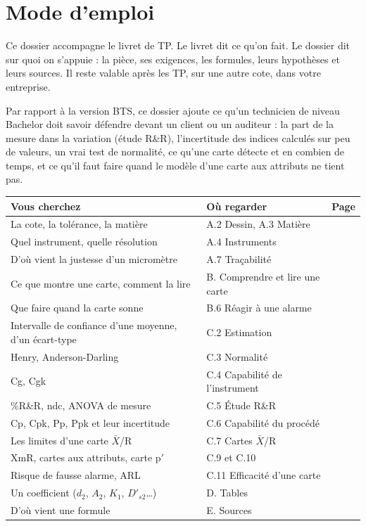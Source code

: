 \documentclass[11pt,a4paper]{article}
\begin{document}
\setcounter{page}{1}
\section*{Mode d'emploi}
Ce dossier accompagne le livret de TP. Le livret dit ce qu'on fait. Le dossier dit sur quoi on s'appuie : la pièce, ses exigences, les formules, leurs hypothèses et leurs sources. Il reste valable après les TP, sur une autre cote, dans votre entreprise.

Par rapport à la version BTS, ce dossier ajoute ce qu'un technicien de niveau Bachelor doit savoir défendre devant un client ou un auditeur : la part de la mesure dans la variation (étude R\&R), l'incertitude des indices calculés sur peu de valeurs, un vrai test de normalité, ce qu'une carte détecte et en combien de temps, et ce qu'il faut faire quand le modèle d'une carte aux attributs ne tient pas.

\begin{center}\small
\begin{tabularx}{\textwidth}{@{}Xll@{}}
\toprule
\textbf{Vous cherchez} & \textbf{Où regarder} & \textbf{Page}\\\midrule
La cote, la tolérance, la matière & A.2 Dessin, A.3 Matière & \pageref{sec:dessin}\\
Quel instrument, quelle résolution & A.4 Instruments & \pageref{sec:instr}\\
D'où vient la justesse d'un micromètre & A.7 Traçabilité & \pageref{sec:traca}\\
Ce que montre une carte, comment la lire & B. Comprendre et lire une carte & \pageref{sec:B}\\
Que faire quand la carte sonne & B.6 Réagir à une alarme & \pageref{sec:reagir}\\
Intervalle de confiance d'une moyenne, d'un écart-type & C.2 Estimation & \pageref{sec:ic}\\
Henry, Anderson-Darling & C.3 Normalité & \pageref{sec:normalite}\\
Cg, Cgk & C.4 Capabilité de l'instrument & \pageref{sec:cg}\\
\%R\&R, ndc, ANOVA de mesure & C.5 Étude R\&R & \pageref{sec:rr}\\
Cp, Cpk, Pp, Ppk et leur incertitude & C.6 Capabilité du procédé & \pageref{sec:cap}\\
Les limites d'une carte $\bar X$/R & C.7 Cartes $\bar X$/R & \pageref{sec:xbarr}\\
XmR, cartes aux attributs, carte p$'$ & C.9 et C.10 & \pageref{sec:xmr}\\
Risque de fausse alarme, ARL & C.11 Efficacité d'une carte & \pageref{sec:arl}\\
Un coefficient ($d_2$, $A_2$, $K_1$, $D'_{s2}$\ldots) & D. Tables & \pageref{sec:D}\\
D'où vient une formule & E. Sources & \pageref{sec:E}\\
\bottomrule
\end{tabularx}
\end{center}
\end{document}
